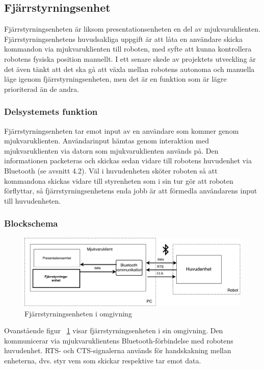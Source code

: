 \documentclass{article}
\begin{document}
\clearpage

\subsection{Fjärrstyrningsenhet}
Fjärrstyrningsenheten är liksom presentationsenheten en del av mjukvaruklienten. Fjärrstyrningsenhetens huvudsakliga uppgift är att låta en användare skicka kommandon via mjukvaruklienten till roboten, med syfte att kunna kontrollera robotens fysiska position manuellt. I ett senare skede av projektets utveckling är det även tänkt att det ska gå att växla mellan robotens autonoma och manuella läge igenom fjärrstyrningsenheten, men det är en funktion som är lägre prioriterad än de andra.

\subsubsection{Delsystemets funktion}
Fjärrstyrningsenheten tar emot input av en användare som kommer genom mjukvaruklienten. Användarinput hämtas genom interaktion med mjukvaruklienten via datorn som mjukvaruklienten används på. Den informationen packeteras och skickas sedan vidare till robotens huvudenhet via Bluetooth (se avsnitt 4.2). Väl i huvudenheten sköter roboten så att kommandona skickas vidare till styrenheten som i sin tur gör att roboten förflyttar, så fjärrstyrningsenhetens enda jobb är att förmedla användarens input till huvudenheten.


\subsubsection{Blockschema}
\begin{figure}[H]
\centering 
\includegraphics[scale=0.5]{Oversikt_fjarrstyrenhet}
\caption{Fjärrstyrningsenheten i omgivning}
\label{fig:Oversikt_fjarrstyrenhet}
\end{figure}
Ovanstående figur ~\ref{fig:Oversikt_fjarrstyrenhet} visar fjärrstyrningsenheten i sin omgivning. Den kommunicerar via mjukvaruklientens Bluetooth-förbindelse med robotens huvudenhet. RTS- och CTS-signalerna används för handskakning mellan enheterna, dvs. styr vem som skickar respektive tar emot data.  
\end{document}
